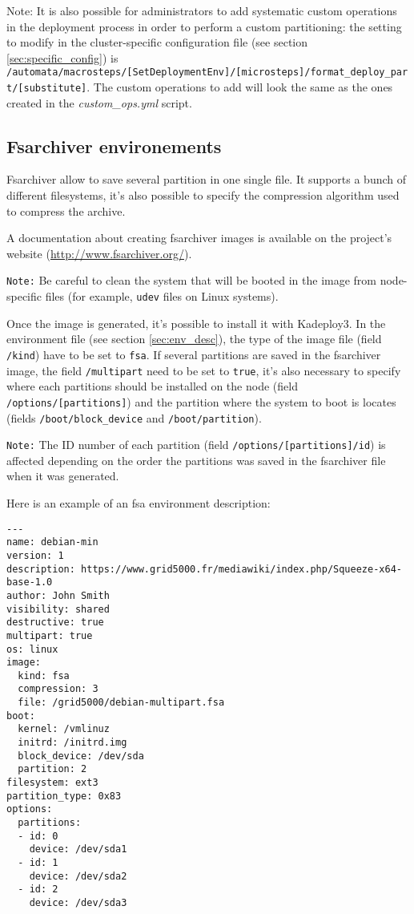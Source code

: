 \documentclass[a4wide,10pt,oneside]{book}
\newcommand{\ypath}[1]{\texttt{#1}}
\begin{document}
Note: It is also possible for administrators to add systematic custom operations in the deployment process in order to perform a custom partitioning: the setting to modify in the cluster-specific configuration file (see section \ref{sec:specific_config}) is \ypath{/automata/macrosteps/[SetDeploymentEnv]/[microsteps]/format\_deploy\_part/[substitute]}. The custom operations to add will look the same as the ones created in the \emph{custom\_ops.yml} script.


\subsection{Fsarchiver environements}\label{sec:fsa}
Fsarchiver allow to save several partition in one single file. It supports a bunch of different filesystems, it's also possible to specify the compression algorithm used to compress the archive.

A documentation about creating fsarchiver images is available on the project's website (\url{http://www.fsarchiver.org/}).

\texttt{Note:} Be careful to clean the system that will be booted in the image from node-specific files (for example, \texttt{udev} files on Linux systems).

Once the image is generated, it's possible to install it with Kadeploy3. In the environment file (see section \ref{sec:env_desc}), the type of the image file (field \ypath{/kind}) have to be set to \texttt{fsa}. If several partitions are saved in the fsarchiver image, the field \ypath{/multipart} need to be set to \texttt{true}, it's also necessary to specify where each partitions should be installed on the node (field \ypath{/options/[partitions]}) and the partition where the system to boot is locates (fields \ypath{/boot/block\_device} and \ypath{/boot/partition}).

\texttt{Note:} The ID number of each partition (field \ypath{/options/[partitions]/id}) is affected depending on the order the partitions was saved in the fsarchiver file when it was generated.

Here is an example of an fsa environment description:
\begin{small}
\begin{verbatim}
---
name: debian-min
version: 1
description: https://www.grid5000.fr/mediawiki/index.php/Squeeze-x64-base-1.0
author: John Smith
visibility: shared
destructive: true
multipart: true
os: linux
image:
  kind: fsa
  compression: 3
  file: /grid5000/debian-multipart.fsa
boot:
  kernel: /vmlinuz
  initrd: /initrd.img
  block_device: /dev/sda
  partition: 2
filesystem: ext3
partition_type: 0x83
options:
  partitions:
  - id: 0
    device: /dev/sda1
  - id: 1
    device: /dev/sda2
  - id: 2
    device: /dev/sda3
\end{verbatim}
\end{small}


\end{document}
